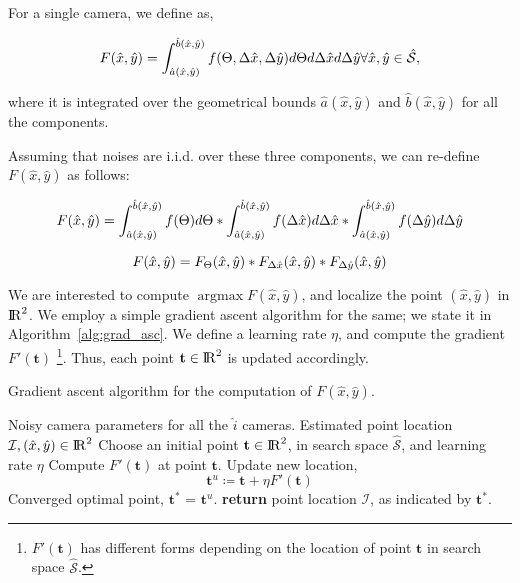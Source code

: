 For a single camera, we define as, 

\begin{equation*}
\centering
F(\hat{x},\hat{y}) = \int_{\hat{a}(\hat{x},\hat{y})}^{\hat{b}(\hat{x},\hat{y})} f(\Theta , \Delta \hat{x} , \Delta \hat{y})d\Theta d\Delta \hat{x} d\Delta \hat{y}\forall \hat{x},\hat{y} \in \hat{\mathcal{S}},
\end{equation*}

where it is integrated over the geometrical bounds $\hat{a}(\hat{x},\hat{y})$ and $\hat{b}(\hat{x},\hat{y})$ for all the components. 

Assuming that noises are i.i.d. over these three components, we can re-define $F(\hat{x},\hat{y})$ as follows:

\begin{equation*}
\centering
F(\hat{x},\hat{y}) = \int_{\hat{a}(\hat{x},\hat{y})}^{\hat{b}(\hat{x},\hat{y})} f(\Theta)d\Theta * \int_{\hat{a}(\hat{x},\hat{y})}^{\hat{b}(\hat{x},\hat{y})} f(\Delta \hat{x})d\Delta \hat{x} * \int_{\hat{a}(\hat{x},\hat{y})}^{\hat{b}(\hat{x},\hat{y})} f(\Delta \hat{y})d\Delta \hat{y}
\end{equation*}

\begin{equation*}
\centering
F(\hat{x},\hat{y}) = F_{\Theta}(\hat{x},\hat{y})*F_{\Delta \hat{x}}(\hat{x},\hat{y})*F_{\Delta \hat{y}}(\hat{x},\hat{y})
\end{equation*}

We are interested to compute ${\operatorname{argmax}}F(\hat{x},\hat{y})$, and localize the point $(\hat{x},\hat{y})$ in ${\rm I\!R}^{2}$. We employ a simple gradient ascent algorithm for the same; we state it in Algorithm~\ref{alg:grad_asc}. We define a learning rate $\eta$, and compute the gradient $F'(\mathbf{t})$ \footnote{$F'(\mathbf{t})$ has different forms depending on the location of point $\mathbf{t}$ in search space $\hat{\mathcal{S}}$.}. Thus, each point $\mathbf{t} \in {\rm I\!R}^{2}$ is updated accordingly.

\begin{algorithm}[htb]
\caption{Gradient ascent algorithm for the computation of $F(\hat{x},\hat{y})$.}
\label{alg:grad_asc} 
\begin{algorithmic}[1]
\Require Noisy camera parameters for all the $\hat{i}$ cameras.
\Ensure Estimated point location $\mathcal{I}, (\hat{x},\hat{y}) \in {\rm I\!R}^{2}$
\State Choose an initial point $\mathbf{t} \in {\rm I\!R}^{2}$, in search space $\hat{\mathcal{S}}$, and learning rate $\eta$
\State Compute $F'(\mathbf{t})$ at point $\mathbf{t}$.
\State Update new location, $$\mathbf{t}^u \coloneqq \mathbf{t} + \eta F'(\mathbf{t})$$
\EndLoop
\State Converged optimal point, $\mathbf{t}^{*}$ = $\mathbf{t}^u$.
\State \textbf{return} point location $\mathcal{I}$, as indicated by $\mathbf{t}^{*}$.
\end{algorithmic}
\end{algorithm}


